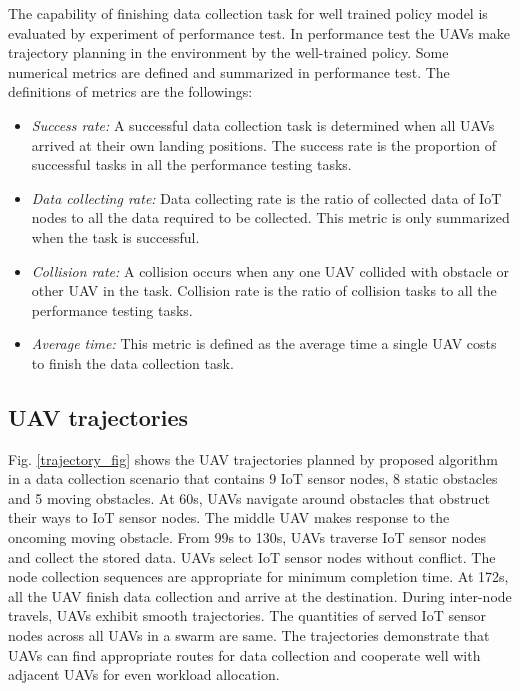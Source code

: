 \documentclass[journal]{IEEEtran}
\begin{document}
The capability of finishing data collection task for well trained policy model is evaluated by experiment of performance test. In performance test the UAVs make trajectory planning in the environment by the well-trained policy. Some numerical metrics are defined and summarized in performance test. The definitions of metrics are the followings: 
\begin{itemize}
    \item\textit{Success rate:} A successful data collection task is determined when all UAVs arrived at their own landing positions. The success rate is the proportion of successful tasks in all the performance testing tasks. 
    \item\textit{Data collecting rate:} Data collecting rate is the ratio of collected data of IoT nodes to all the data required to be collected. This metric is only summarized when the task is successful. 
    \item\textit{Collision rate:} A collision occurs when any one UAV collided with obstacle or other UAV in the task. Collision rate is the ratio of collision tasks to all the performance testing tasks. 
    \item\textit{Average time:} This metric is defined as the average time a single UAV costs to finish the data collection task. 
\end{itemize}
\subsection{UAV trajectories}\label{trajectory}
Fig. \ref{trajectory_fig} shows the UAV trajectories planned by proposed algorithm in a data collection scenario that contains 9 IoT sensor nodes, 8 static obstacles and 5 moving obstacles. At 60s, UAVs navigate around obstacles that obstruct their ways to IoT sensor nodes. The middle UAV makes response to the oncoming moving obstacle. From 99s to 130s, UAVs traverse IoT sensor nodes and collect the stored data. UAVs select IoT sensor nodes without conflict. The node collection sequences are appropriate for minimum completion time. At 172s, all the UAV finish data collection and arrive at the destination. During inter-node travels, UAVs exhibit smooth trajectories. The quantities of served IoT sensor nodes across all UAVs in a swarm are same. The trajectories demonstrate that UAVs can find appropriate routes for data collection and cooperate well with adjacent UAVs for even workload allocation. 
\end{document}
